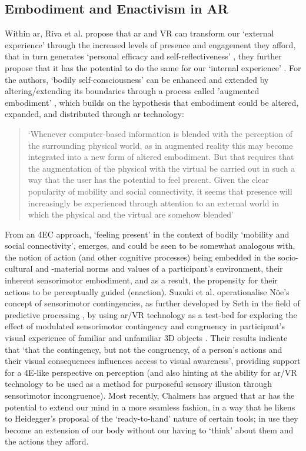 \subsection{Embodiment and Enactivism in AR}\label{sec: theory-embodimentar}
Within \gls{ar}, Riva et al. propose that \gls{ar} and VR can transform our `external experience' through the increased levels of presence and engagement they afford, that in turn generates `personal efficacy and self-reflectiveness' \citeyearpar[p. 10]{riva2016}, they further propose that it has the potential to do the same for our `internal experience' . For the authors, `bodily self-consciousness' can be enhanced and extended by altering/extending its boundaries through a process called 'augmented embodiment' , which builds on the hypothesis that embodiment could be altered, expanded, and distributed through \gls{ar} technology: 
\begin{quote}
    `Whenever computer-based information is blended with the perception of the surrounding physical world, as in augmented reality this may become integrated into a new form of altered embodiment. But that requires that the augmentation of the physical with the virtual be carried out in such a way that the user has the potential to feel present. Given the clear popularity of mobility and social connectivity, it seems that presence will increasingly be experienced through attention to an external world in which the physical and the virtual are somehow blended' \citep[]{waterworth2014}
\end{quote}
From an 4EC approach, `feeling present' in the context of bodily `mobility and social connectivity', emerges, and could be seen to be somewhat analogous with, the notion of action (and other cognitive processes) being embedded in the  socio-cultural and -material norms and values of a participant's environment, their inherent sensorimotor embodiment, and as a result, the propensity for their actions to be perceptually guided (enaction). Suzuki et al. operationalise Nöe's \citeyearpar[]{noe2004} concept of sensorimotor contingencies, as further developed by Seth in the field of predictive processing \citeyearpar[]{seth2014}, by using \gls{ar}/VR technology as a test-bed for exploring the effect of modulated sensorimotor contingency and congruency in participant's visual experience of familiar and unfamiliar 3D objects \citep[]{suzuki2019}. Their results indicate that `that the contingency, but not the congruency, of a person's actions and their visual consequences influences access to visual awareness', providing support for a 4E-like perspective on perception (and also hinting at the ability for \gls{ar}/VR technology to be used as a method for purposeful sensory illusion through sensorimotor incongruence). Most recently, Chalmers has argued that \gls{ar} has the potential to extend our mind in a more seamless fashion, in a way that he likens to Heidegger's proposal of the `ready-to-hand' nature of certain tools; in use they become an extension of our body without our having to `think' about them and the actions they afford.
